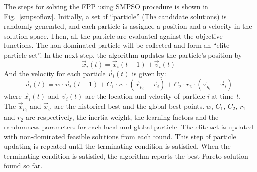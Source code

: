 \documentclass[10pt,journal,compsoc]{IEEEtran}
\newcommand{\Fig}[1]{Fig.~\ref{#1}}
\newcommand{\Eq}[1]{(\ref{#1})}
\begin{document}
The steps for solving the FPP using SMPSO procedure is shown in \Fig{smpsoflow}. Initially, a set of ``particle'' (The candidate solutions) is randomly generated, and each particle is assigned a position and a velocity in the solution space. Then, all the particle are evaluated against the objective functions. The non-dominated particle will be collected and form an ``elite-particle-set''. In the next step, the algorithm updates the particle's position by
\begin{equation}\label{psoposition}
	\vec{x}_i(t) = \vec{x}_i(t-1) + \vec{v}_i(t)
\end{equation}
And the velocity for each particle $\vec{v}_i(t)$ is given by:
\begin{equation}\label{psospeed}
\vec{v}_i(t) = w \cdot \vec{v}_i(t-1) + C_1 \cdot r_1 \cdot (\vec{x}_{p_i}- \vec{x}_i)+ C_2 \cdot r_2 \cdot (\vec{x}_{g_i} - \vec{x}_i)
\end{equation}
where $\vec{x}_i(t)$ and $\vec{v}_i(t)$ are the location and velocity of particle \textit{i} at time \textit{t}. 
The $\vec{x}_{p_i}$ and $\vec{x}_{g_i}$ are the historical best and the global best points.
$w$, $C_1$, $C_2$, $r_1$ and $r_2 $ are respectively, the inertia weight, the learning factors and the randomness parameters for each local and global particle.
The elite-set is updated with non-dominated feasible solutions from each round. This step of particle updating is repeated until the terminating condition is satisfied. When the terminating condition is satisfied, the algorithm reports the best Pareto solution found so far.
%
\end{document}
